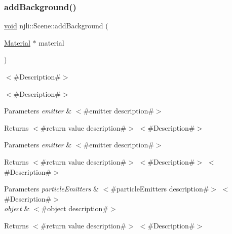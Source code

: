 \mbox{\label{classnjli_1_1_scene_a1df198e68ada8de3eb23caa2eba04f5b}} 
\subsubsection{\texorpdfstring{add\+Background()}{addBackground()}}
{\footnotesize\ttfamily \mbox{\hyperlink{_thread_8h_af1e856da2e658414cb2456cb6f7ebc66}{void}} njli\+::\+Scene\+::add\+Background (\begin{DoxyParamCaption}\item[{\mbox{\hyperlink{classnjli_1_1_material}{Material}} $\ast$}]{material }\end{DoxyParamCaption})}



$<$\#\+Description\#$>$ 

$<$\#\+Description\#$>$


\begin{DoxyParams}{Parameters}
{\em emitter} & $<$\#emitter description\#$>$\\
\hline
\end{DoxyParams}
\begin{DoxyReturn}{Returns}
$<$\#return value description\#$>$ $<$\#\+Description\#$>$
\end{DoxyReturn}

\begin{DoxyParams}{Parameters}
{\em emitter} & $<$\#emitter description\#$>$\\
\hline
\end{DoxyParams}
\begin{DoxyReturn}{Returns}
$<$\#return value description\#$>$ $<$\#\+Description\#$>$ $<$\#\+Description\#$>$
\end{DoxyReturn}

\begin{DoxyParams}{Parameters}
{\em particle\+Emitters} & $<$\#particle\+Emitters description\#$>$ $<$\#\+Description\#$>$\\
\hline
{\em object} & $<$\#object description\#$>$\\
\hline
\end{DoxyParams}
\begin{DoxyReturn}{Returns}
$<$\#return value description\#$>$ $<$\#\+Description\#$>$
\end{DoxyReturn}

